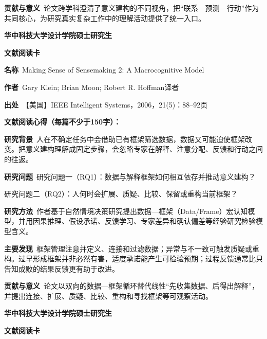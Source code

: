\noindent\textbf{贡献与意义}\ 论文跨学科澄清了意义建构的不同视角，把“联系—预测—行动”作为共同核心，为研究真实复杂工作中的理解活动提供了统一入口。\par
\clearpage
\begin{center}
{\songti\bfseries\fontsize{18.5pt}{27.75pt}\selectfont 华中科技大学设计学院硕士研究生\par}
{\songti\bfseries\fontsize{18.5pt}{27.75pt}\selectfont 文献阅读卡\par}
\end{center}
\vspace{0.25em}
\noindent\underline{}\par
\vspace{0.35em}
\noindent\textbf{名称}\ Making Sense of Sensemaking 2: A Macrocognitive Model\par
\noindent\textbf{作者}\ Gary Klein; Brian Moon; Robert R. Hoffman\quad 译者\par
\noindent\textbf{出处}\ 【美国】IEEE Intelligent Systems，2006，21(5)：88–92\quad 页\par
\vspace{0.35em}
\noindent\textbf{文献阅读心得（每篇不少于150字）：}\par
\noindent\textbf{研究背景}\ 人在不确定任务中会借助已有框架筛选数据，数据又可能迫使框架改变。把意义建构理解成固定步骤，会忽略专家在解释、注意分配、反馈和行动之间的往返。\par
\noindent\textbf{研究问题}\ 研究问题一（RQ1）：数据与解释框架如何相互依存并推动意义建构？\par
研究问题二（RQ2）：人何时会扩展、质疑、比较、保留或重构当前框架？\par
\noindent\textbf{研究方法}\ 作者基于自然情境决策研究提出数据—框架（Data/Frame）宏认知模型，并用因果推理、假设承诺、反馈学习、专家差异和确认偏差等经验研究检验模型含义。\par
\noindent\textbf{主要发现}\ 框架管理注意并定义、连接和过滤数据；异常与不一致可触发质疑或重构。过早形成框架并非必然有害，适度承诺能产生可检验预期；过程反馈通常比只告知成败的结果反馈更有助于改进。\par
\noindent\textbf{贡献与意义}\ 论文以双向的数据—框架循环替代线性“先收集数据、后得出解释”，并提出连接、扩展、质疑、比较、重构和寻找框架等可观察活动。\par
\clearpage
\begin{center}
{\songti\bfseries\fontsize{18.5pt}{27.75pt}\selectfont 华中科技大学设计学院硕士研究生\par}
{\songti\bfseries\fontsize{18.5pt}{27.75pt}\selectfont 文献阅读卡\par}
\end{center}
